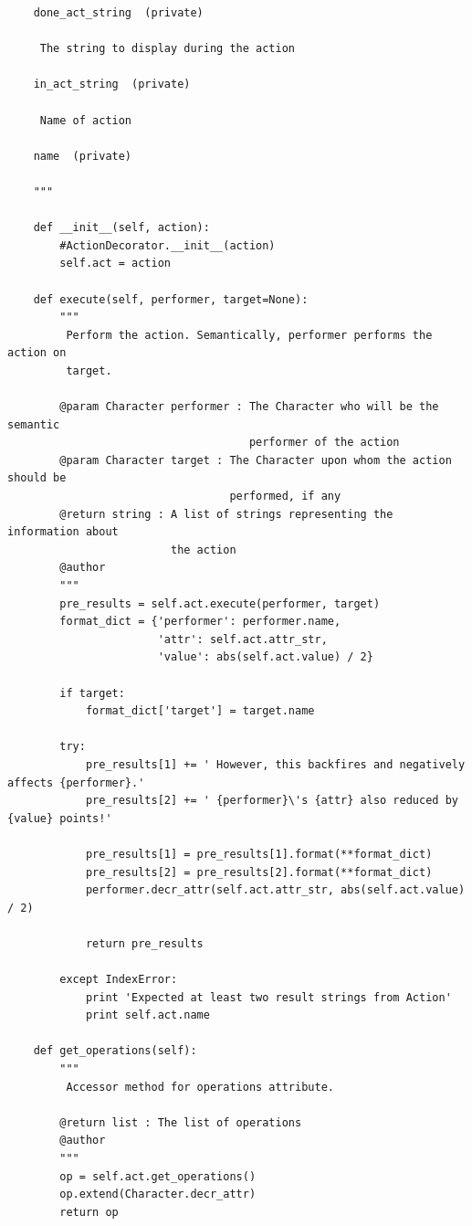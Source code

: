 \documentclass[11pt]{report}
\begin{document}
\begin{verbatim}
    done_act_string  (private)

     The string to display during the action

    in_act_string  (private)

     Name of action

    name  (private)

    """

    def __init__(self, action):
        #ActionDecorator.__init__(action)
        self.act = action

    def execute(self, performer, target=None):
        """
         Perform the action. Semantically, performer performs the action on
         target.

        @param Character performer : The Character who will be the semantic
                                     performer of the action
        @param Character target : The Character upon whom the action should be
                                  performed, if any
        @return string : A list of strings representing the information about
                         the action
        @author
        """
        pre_results = self.act.execute(performer, target)
        format_dict = {'performer': performer.name,
                       'attr': self.act.attr_str,
                       'value': abs(self.act.value) / 2}
        
        if target:
            format_dict['target'] = target.name
        
        try:
            pre_results[1] += ' However, this backfires and negatively affects {performer}.'
            pre_results[2] += ' {performer}\'s {attr} also reduced by {value} points!'
            
            pre_results[1] = pre_results[1].format(**format_dict)
            pre_results[2] = pre_results[2].format(**format_dict)
            performer.decr_attr(self.act.attr_str, abs(self.act.value) / 2)

            return pre_results

        except IndexError:
            print 'Expected at least two result strings from Action'
            print self.act.name

    def get_operations(self):
        """
         Accessor method for operations attribute.
         
        @return list : The list of operations
        @author
        """
        op = self.act.get_operations()
        op.extend(Character.decr_attr)
        return op


\end{verbatim}
\end{document}

